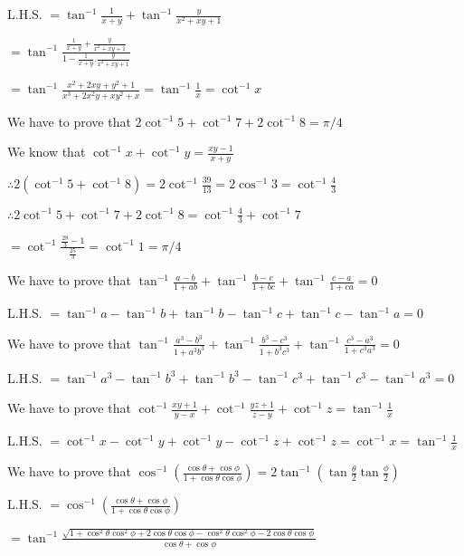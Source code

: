   L.H.S. $= \tan^{-1}\frac{1}{x + y} + \tan^{-1}\frac{y}{x^2 + xy + 1}$

  $= \tan^{-1}\frac{\frac{1}{x + y} + \frac{y}{x^2 + xy + 1}}{1 - \frac{1}{x + y}.\frac{y}{x^2 + xy + 1}}$

  $= \tan^{-1}\frac{x^2 + 2xy + y^2 + 1}{x^3 + 2x^2y + xy^2 + x} = \tan^{-1}\frac{1}{x} = \cot^{-1}x$

\item We have to prove that $2\cot^{-1}5 + \cot^{-1}7 + 2\cot^{-1}8 = \pi/4$

  We know that $\cot^{-1}x + \cot^{-1}y = \frac{xy - 1}{x + y}$

  $\therefore 2\left(\cot^{-1}5 + \cot^{-1}8\right) = 2\cot^{-1}\frac{39}{13} = 2\cos^{-1}3 = \cot^{-1}\frac{4}{3}$

  $\therefore 2\cot^{-1}5 + \cot^{-1}7 + 2\cot^{-1}8 = \cot^{-1}\frac{4}{3} + \cot^{-1}7$

  $=\cot^{-1}\frac{\frac{28}{3} - 1}{\frac{25}{3}} = \cot^{-1}1 = \pi/4$

\item We have to prove that $\tan^{-1}\frac{a - b}{1 + ab} + \tan^{-1}\frac{b - c}{1 + bc} + \tan^{-1}\frac{c - a}{1 + ca} = 0$

  L.H.S. $= \tan^{-1}a - \tan^{-1}b + \tan^{-1}b - \tan^{-1}c + \tan^{-1}c - \tan^{-1}a = 0$

\item We have to prove that $\tan^{-1}\frac{a^3 - b^3}{1 + a^3b^3} + \tan^{-1}\frac{b^3 - c^3}{1 + b^3c^3} +
  \tan^{-1}\frac{c^3 - a^3}{1 + c^3a^3} = 0$

  L.H.S. $= \tan^{-1}a^3 - \tan^{-1}b^3 + \tan^{-1}b^3 - \tan^{-1}c^3 + \tan^{-1}c^3 - \tan^{-1}a^3 = 0$

\item We have to prove that $\cot^{-1}\frac{xy + 1}{y - x} + \cot^{-1}\frac{yz + 1}{z - y} + \cot^{-1}z = \tan^{-1}\frac{1}{x}$

  L.H.S. $= \cot^{-1}x - \cot^{-1}y + \cot^{-1}y - \cot^{-1}z + \cot^{-1}z= \cot^{-1}x = \tan^{-1}\frac{1}{x}$

\item We have to prove that $\cos^{-1}\left(\frac{\cos\theta + \cos\phi}{1 + \cos\theta\cos\phi}\right) =
  2\tan^{-1}\left(\tan\frac{\theta}{2}\tan\frac{\phi}{2}\right)$

  L.H.S. $= \cos^{-1}\left(\frac{\cos\theta + \cos\phi}{1 + \cos\theta\cos\phi}\right)$

  $= \tan^{-1}\frac{\sqrt{1 + \cos^2\theta\cos^2\phi + 2\cos\theta\cos\phi - \cos^2\theta\cos^2\phi -
      2\cos\theta\cos\phi}}{\cos\theta + \cos\phi}$

